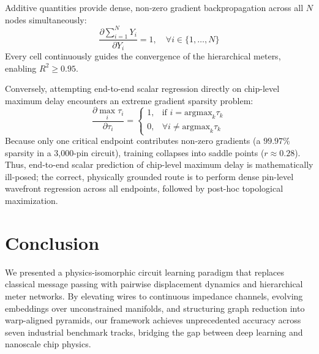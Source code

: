 \documentclass[conference]{IEEEtran}
\begin{document}
Additive quantities provide dense, non-zero gradient backpropagation across all $N$ nodes simultaneously:
\begin{equation}
\frac{\partial \sum_{i=1}^N Y_i}{\partial Y_i} = 1, \quad \forall i \in \{1, \dots, N\}
\end{equation}
Every cell continuously guides the convergence of the hierarchical meters, enabling $R^2 \ge 0.95$. 

Conversely, attempting end-to-end scalar regression directly on chip-level maximum delay encounters an extreme gradient sparsity problem:
\begin{equation}
\frac{\partial \max_{i} \tau_i}{\partial \tau_i} = 
\begin{cases} 
1, & \text{if } i = \text{argmax}_k \tau_k \\ 
0, & \forall i \neq \text{argmax}_k \tau_k 
\end{cases}
\end{equation}
Because only one critical endpoint contributes non-zero gradients (a $99.97\%$ sparsity in a 3,000-pin circuit), training collapses into saddle points ($r \approx 0.28$). Thus, end-to-end scalar prediction of chip-level maximum delay is mathematically ill-posed; the correct, physically grounded route is to perform dense pin-level wavefront regression across all endpoints, followed by post-hoc topological maximization.

\section{Conclusion}
We presented a physics-isomorphic circuit learning paradigm that replaces classical message passing with pairwise displacement dynamics and hierarchical meter networks. By elevating wires to continuous impedance channels, evolving embeddings over unconstrained manifolds, and structuring graph reduction into warp-aligned pyramids, our framework achieves unprecedented accuracy across seven industrial benchmark tracks, bridging the gap between deep learning and nanoscale chip physics.



\end{document}
